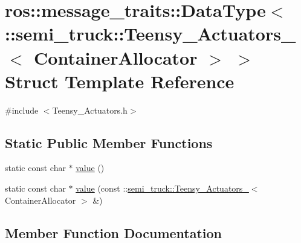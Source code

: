 \hypertarget{structros_1_1message__traits_1_1_data_type_3_01_1_1semi__truck_1_1_teensy___actuators___3_01_container_allocator_01_4_01_4}{}\section{ros\+:\+:message\+\_\+traits\+:\+:Data\+Type$<$ \+:\+:semi\+\_\+truck\+:\+:Teensy\+\_\+\+Actuators\+\_\+$<$ Container\+Allocator $>$ $>$ Struct Template Reference}
\label{structros_1_1message__traits_1_1_data_type_3_01_1_1semi__truck_1_1_teensy___actuators___3_01_container_allocator_01_4_01_4}


{\ttfamily \#include $<$Teensy\+\_\+\+Actuators.\+h$>$}

\subsection*{Static Public Member Functions}
\begin{DoxyCompactItemize}
\item 
static const char $\ast$ \hyperlink{structros_1_1message__traits_1_1_data_type_3_01_1_1semi__truck_1_1_teensy___actuators___3_01_container_allocator_01_4_01_4_a6b6499be4a9876ee3e0fea4de58305dd}{value} ()
\item 
static const char $\ast$ \hyperlink{structros_1_1message__traits_1_1_data_type_3_01_1_1semi__truck_1_1_teensy___actuators___3_01_container_allocator_01_4_01_4_ac5bdbe2e6de1660232532de02723bb40}{value} (const \+::\hyperlink{structsemi__truck_1_1_teensy___actuators__}{semi\+\_\+truck\+::\+Teensy\+\_\+\+Actuators\+\_\+}$<$ Container\+Allocator $>$ \&)
\end{DoxyCompactItemize}


\subsection{Member Function Documentation}
